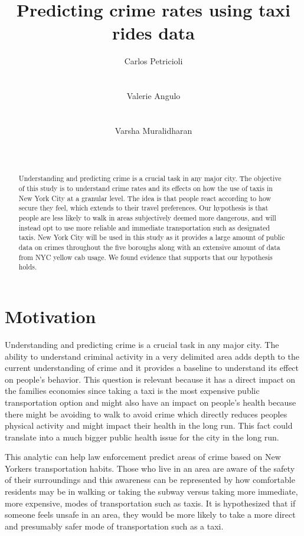 \documentclass{sigkddExp}
\title{Predicting crime rates using taxi rides data}
\author{
\alignauthor Carlos Petricioli \\
       \affaddr{New York University}\\
       \affaddr{New York, USA}\\
       \email{petricioli@nyu.edu}
\alignauthor Valerie Angulo\\
       \affaddr{New York University}\\
       \affaddr{New York, USA}\\
       \email{vaa238@nyu.edu}
\alignauthor Varsha Muralidharan \\
       \affaddr{New York University}\\
       \affaddr{New York, USA}\\
       \email{vm1370@nyu.edu}
}
\begin{document}
\maketitle


\begin{abstract}

Understanding and predicting crime is a crucial task in any major city. The objective of this study is to understand crime rates and its effects on how the use of taxis in New York City at a granular level. The idea  is that people react according to how secure they feel, which extends to their travel preferences. 
Our hypothesis is that people are less likely to walk in areas subjectively deemed more dangerous, and will instead opt to use more reliable and immediate transportation such as designated taxis. 
New York City will be used in this study as it provides a large amount of public data on crimes throughout the five boroughs along with an extensive amount of data from NYC yellow cab usage. 
We found evidence that supports that our hypothesis holds.

\end{abstract}




\section{Motivation}

Understanding and predicting crime is a crucial task in any major city. 
The ability to understand criminal activity in a very delimited area adds depth to the current understanding of crime and  it provides a baseline to understand its effect on people's behavior. 
This question is relevant because it has a direct impact on the families economies since taking a taxi is the most expensive public transportation option and might also have an impact on people's health because there might be avoiding to walk to avoid crime which directly reduces peoples physical activity and might impact their health in the long run. 
This fact could translate into a much bigger public health issue for the city in the long run. %

This analytic can help law enforcement predict areas of crime based on New Yorkers transportation habits. Those who live in an area are aware of the safety of their surroundings and this awareness can be represented by how comfortable residents may be in walking or taking the subway versus taking more immediate, more expensive, modes of transportation such as taxis. It is hypothesized that if someone feels unsafe in an area, they would be more likely to take a more direct and presumably safer mode of transportation such as a taxi. 
\end{document}
